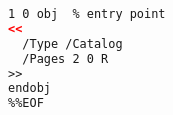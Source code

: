
\begin{lstlisting}[language=xml,caption=\texttt{example.pdf}: Synthax einer PDF Datei,label={lst:example.pdf}]
%PDF-1.7
1 0 obj  % entry point
<<
  /Type /Catalog
  /Pages 2 0 R
>>
endobj
%%EOF
\end{lstlisting}